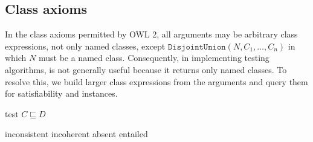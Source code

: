 \documentclass[paper.tex]{subfiles}
\begin{document}
\subsection{Class axioms}
\label{sec:algorithms:class}


In the class axioms permitted by OWL 2, all arguments may be arbitrary class expressions, not only named classes, except $\mathtt{DisjointUnion}(N, C_1, \ldots, C_n)$ in which $N$ must be a named class.  Consequently, in implementing testing algorithms,  is not generally useful because it returns only named classes.  To resolve this, we build larger class expressions from the arguments and query them for satisfiability and instances.

\begin{algorithm}[H]
  \caption{test $C \sqsubseteq D$}
  \begin{algorithmic}[1]
    \raggedright
        \State \Return inconsistent
        \label{alg:testSubClassOf:returnInconsistent}
        \State \Return incoherent
        \label{alg:testSubClassOf:returnIncoherent}
        \State \Return absent
      \Else
        \State \Return entailed
        \label{alg:testSubClassOf:returnEntailed}
      \EndIf
    \EndFunction
  \end{algorithmic}
\end{algorithm}
\end{document}
